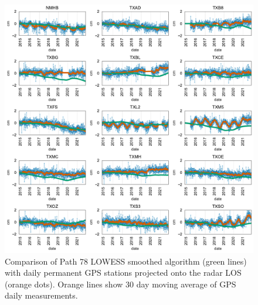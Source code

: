 \begin{figure}
	\centering
	\includegraphics[width=.99\textwidth]{figures/chapter5-lowess/gps_path78.pdf}
	\caption[Full GPS comparison for Path 78 LOWESS solutions]{
		Comparison of Path 78 LOWESS smoothed algorithm (green lines) with daily permanent GPS stations projected onto the radar LOS (orange dots). Orange lines show 30 day moving average of GPS daily measurements.
	}
	\label{fig:ch5-results-gps}
\end{figure}

\FloatBarrier



